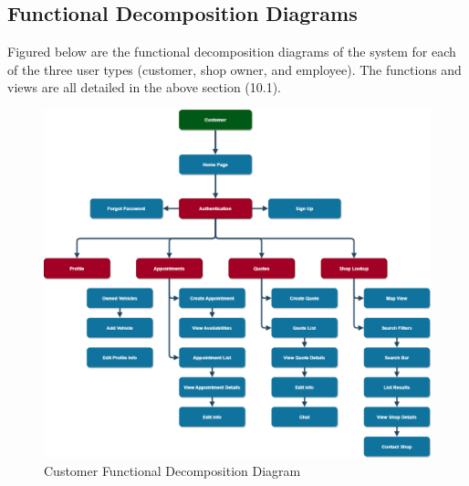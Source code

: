 \documentclass[12pt]{article}
\newcounter{vendorreqnum} %
\begin{document}
    

\subsection{Functional Decomposition Diagrams}

Figured below are the functional decomposition diagrams of the system for each of the three user types (customer, shop owner, and employee). The functions and views are all detailed in the above section (10.1).

\begin{figure}[H]
    \centering
    \includegraphics[scale=0.3]{SRS/customer_decomp.png}
    \caption{Customer Functional Decomposition Diagram}
    \label{fig:cfdf}
\end{figure}
\end{document}
